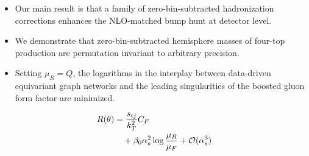 \begin{itemize}
  \item Our main result is that a family of zero-bin-subtracted hadronization corrections enhances the NLO-matched bump hunt at detector level.
  \item We demonstrate that zero-bin-subtracted hemisphere masses of four-top production are permutation invariant to arbitrary precision.
  \item Setting $\mu_R = Q$, the logarithms in the interplay between data-driven equivariant graph networks and the leading singularities of the boosted gluon form factor are minimized.
\end{itemize}

\begin{align}
  R(\theta) &= \frac{s_{ij}}{k_T^2} C_F \nonumber \\
  &\quad + \beta_0 \alpha_s^2 \log\frac{\mu_R}{\mu_F} + \mathcal{O}(\alpha_s^3) \label{eq:2}
\end{align}

